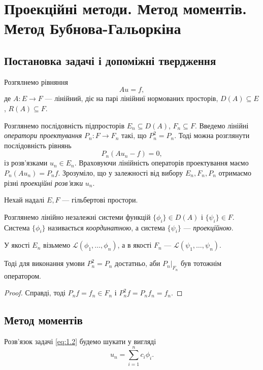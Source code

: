 \section{Проекційні методи. Метод моментів. \texorpdfstring{\\}{} Метод Бубнова-Гальоркіна}
\subsection{Постановка задачі і допоміжні твердження}
Розгялнемо рівняння
\begin{equation}
    \label{eq:1.1}
    A u = f,
\end{equation}
де $A: E \to F$ --- лінійний, діє на парі лінійниї нормованих просторів, $D(A) \subseteq E$, $R(A) \subseteq F$. \medskip

Розглянемо послідовність підпросторів $E_n \subseteq D(A)$, $F_n \subseteq F$. Введемо лінійні \textit{оператори проектування} $P_n: F \to F_n$ такі, що $P_n^2 = P_n$. Тоді можна розглянути послідовність рівнянь
\begin{equation}
    \label{eq:1.2}
    P_n (A u_n - f) = 0,
\end{equation}
із розв'язками $u_n \in E_n$. Враховуючи лінійність операторів проектування маємо $P_n (A u_n) = P_n f$. Зрозуміло, що у залежності від вибору $E_n, F_n, P_n$ отримаємо різні \textit{проекційні розв'язки} $u_n$. \medskip

Нехай надалі $E, F$ --- гільбертові простори.

\begin{definition}
    Розглянемо лінійно незалежні системи функцій $\{\phi_i\} \in D(A)$ і $\{\psi_i\} \in F$. Система $\{\phi_i\}$ називається \textit{координатною}, а система $\{\psi_i\}$ --- \textit{проекційною}.
\end{definition}

У якості $E_n$ візьмемо $\mathcal{L}(\phi_1, \ldots, \phi_n)$, а в якості $F_n$ --- $\mathcal{L}(\psi_1, \ldots, \psi_n)$.

\begin{proposition}
    Тоді для виконання умови $P_n^2 = P_n$ достатньо, аби $P_n|_{F_n}$ був тотожнім оператором.
\end{proposition}
\begin{proof}
    Справді, тоді $P_n f = f_n \in F_n$ і $P_n^2 f = P_n f_n = f_n$.
\end{proof}
\subsection{Метод моментів}
Розв'язок задачі \eqref{eq:1.2} будемо шукати у вигляді
\begin{equation}
    \label{eq:1.3}
    u_n = \sum_{i = 1}^n c_i \phi_i.
\end{equation}

